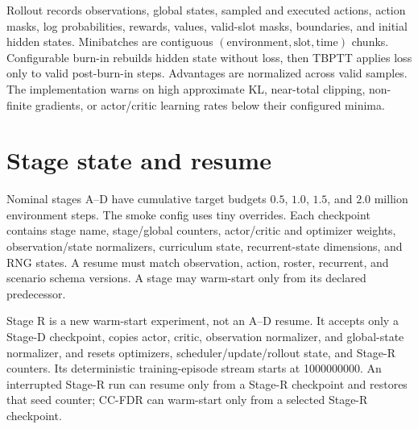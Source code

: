 \documentclass[12pt,twocolumn]{article}
\begin{document}
Rollout records observations, global states, sampled and executed actions, action masks, log
probabilities, rewards, values, valid-slot masks, boundaries, and initial hidden states. Minibatches
are contiguous $(\text{environment},\text{slot},\text{time})$ chunks. Configurable burn-in rebuilds
hidden state without loss, then TBPTT applies loss only to valid post-burn-in steps. Advantages are
normalized across valid samples. The implementation warns on high approximate KL, near-total
clipping, non-finite gradients, or actor/critic learning rates below their configured minima.

\section{Stage state and resume}
Nominal stages A--D have cumulative target budgets $0.5$, $1.0$, $1.5$, and $2.0$ million
environment steps. The smoke config uses tiny overrides. Each checkpoint contains stage name,
stage/global counters, actor/critic and optimizer weights, observation/state normalizers,
curriculum state, recurrent-state dimensions, and RNG states. A resume must match observation,
action, roster, recurrent, and scenario schema versions. A stage may warm-start only from its
declared predecessor.

Stage R is a new warm-start experiment, not an A--D resume. It accepts only a Stage-D checkpoint,
copies actor, critic, observation normalizer, and global-state normalizer, and resets optimizers,
scheduler/update/rollout state, and Stage-R counters. Its deterministic training-episode stream
starts at 1000000000. An interrupted Stage-R run can resume only from a Stage-R checkpoint and
restores that seed counter; CC-FDR can warm-start only from a selected Stage-R checkpoint.
\end{document}

